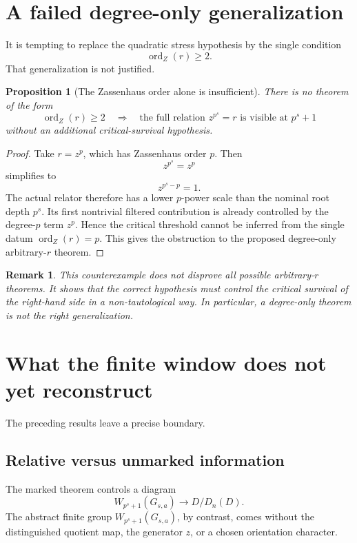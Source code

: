\documentclass[11pt]{article}
\newtheorem{proposition}[theorem]{Proposition}
\newtheorem{remark}[theorem]{Remark}
\newcommand{\Dn}{D_n}
\newcommand{\W}{W}
\newcommand{\ordz}{\operatorname{ord}_{Z}}
\begin{document}
\section{A failed degree-only generalization}

It is tempting to replace the quadratic stress hypothesis by the single
condition
\[
\ordz(r)\ge2.
\]
That generalization is not justified.

\begin{proposition}[The Zassenhaus order alone is insufficient]
There is no theorem of the form
\[
\ordz(r)\ge2
\quad\Longrightarrow\quad
\text{the full relation }z^{p^s}=r
\text{ is visible at }p^s+1
\]
without an additional critical-survival hypothesis.

\end{proposition}

\begin{proof}
Take $r=z^p$, which has Zassenhaus order $p$.  Then
\[
z^{p^s}=z^p
\]
simplifies to
\[
z^{p^s-p}=1.
\]
The actual relator therefore has a lower $p$-power scale than the
nominal root depth $p^s$.  Its first nontrivial filtered contribution is
already controlled by the degree-$p$ term $z^p$.  Hence the critical
threshold cannot be inferred from the single datum
$\ordz(r)=p$.  This gives the obstruction to the proposed
degree-only arbitrary-$r$ theorem.
\end{proof}
\begin{remark}
This counterexample does not disprove all possible arbitrary-$r$
theorems.  It shows that the correct hypothesis must control the
critical survival of the right-hand side in a non-tautological way.
In particular, a degree-only theorem is not the right generalization.
\end{remark}

\section{What the finite window does not yet reconstruct}

The preceding results leave a precise boundary.

\subsection{Relative versus unmarked information}

The marked theorem controls a diagram
\[
\W_{p^s+1}(G_{s,a})
\longrightarrow
D/\Dn(D).
\]
The abstract finite group
\(\W_{p^s+1}(G_{s,a})\), by contrast, comes without the distinguished
quotient map, the generator $z$, or a chosen orientation character.
\end{document}
